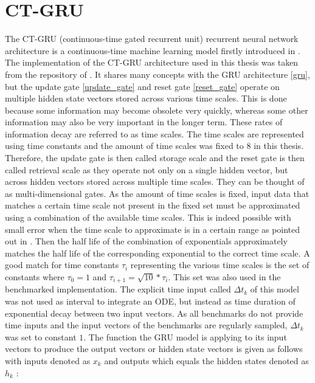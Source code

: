 \documentclass[draft,final]{vutinfth} %
\begin{document}
    \section{CT-GRU} \label{ctgru}
    The CT-GRU (continuous-time gated recurrent unit) recurrent neural network architecture is a continuous-time machine learning model firstly introduced in \cite{CTGRU}.
    The implementation of the CT-GRU architecture used in this thesis was taken from the repository of \cite{ODELSTM}.
    It shares many concepts with the GRU architecture \ref{gru}, but the update gate \ref{update_gate} and reset gate \ref{reset_gate} operate on multiple hidden state vectors stored across various time scales.
    This is done because some information may become obsolete very quickly, whereas some other information may also be very important in the longer term.
    These rates of information decay are referred to as time scales.
    The time scales are represented using time constants and the amount of time scales was fixed to $8$ in this thesis.
    Therefore, the update gate is then called storage scale and the reset gate is then called retrieval scale as they operate not only on a single hidden vector, but across hidden vectors stored across multiple time scales.
    They can be thought of as multi-dimensional gates.
    As the amount of time scales is fixed, input data that matches a certain time scale not present in the fixed set must be approximated using a combination of the available time scales.
    This is indeed possible with small error when the time scale to approximate is in a certain range as pointed out in \cite[p. 5-6]{CTGRU}.
    Then the half life of the combination of exponentials approximately matches the half life of the corresponding exponential to the correct time scale.
    A good match for time constants $\tau_i$ representing the various time scales is the set of constants where $\tau_0=1$ and $\tau_{i+1} = \sqrt{10} * \tau_{i}$.
    This set was also used in the benchmarked implementation.
    The explicit time input called $\Delta t_k$ of this model was not used as interval to integrate an ODE, but instead as time duration of exponential decay between two input vectors.
    As all benchmarks do not provide time inputs and the input vectors of the benchmarks are regularly sampled, $\Delta t_k$ was set to constant $1$.
    The function the GRU model is applying to its input vectors to produce the output vectors or hidden state vectors is given as follows with inputs denoted as $x_k$ and outputs which equals the hidden states denoted as $h_k$ \cite[p. 7]{CTGRU}:
\end{document}
